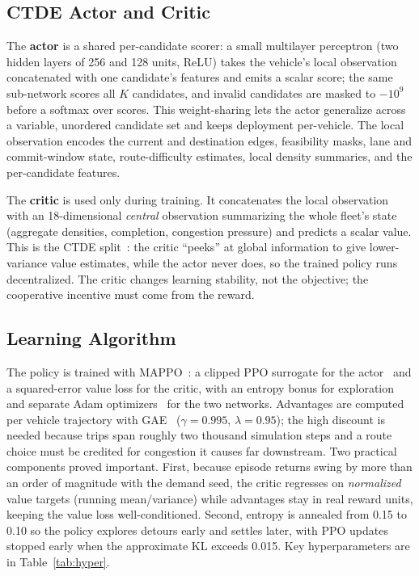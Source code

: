 \subsection{CTDE Actor and Critic}
The \textbf{actor} is a shared per-candidate
scorer: a small multilayer perceptron (two hidden layers of 256 and 128 units, ReLU)
takes the vehicle's local observation concatenated with one candidate's features and
emits a scalar score; the same sub-network scores all $K$ candidates, and invalid
candidates are masked to $-10^{9}$ before a softmax over scores. This weight-sharing lets
the actor generalize across a variable, unordered candidate set and keeps deployment
per-vehicle. The local observation encodes the current and destination edges, feasibility
masks, lane and commit-window state, route-difficulty estimates, local density summaries,
and the per-candidate features.

The \textbf{critic} is used only during training. It concatenates the local observation
with an 18-dimensional \emph{central} observation summarizing the whole fleet's state
(aggregate densities, completion, congestion pressure) and predicts a scalar value. This
is the CTDE split~\citep{lowe2017maddpg}: the critic ``peeks'' at global information to
give lower-variance value estimates, while the actor never does, so the trained policy
runs decentralized. The critic changes learning stability, not the objective; the
cooperative incentive must come from the reward.

\subsection{Learning Algorithm}
The policy is trained with MAPPO~\citep{yu2022mappo}: a clipped PPO surrogate for the
actor~\citep{schulman2017ppo} and a squared-error value loss for the critic, with an
entropy bonus for exploration and separate Adam optimizers~\citep{kingma2015adam} for the
two networks. Advantages are computed per vehicle trajectory with
GAE~\citep{schulman2016gae} ($\gamma{=}0.995$, $\lambda{=}0.95$); the high discount is
needed because trips span roughly two thousand simulation steps and a route choice must
be credited for congestion it causes far downstream. Two practical components proved
important. First, because episode returns swing by more than an order of magnitude with the
demand seed, the critic regresses on \emph{normalized} value targets (running mean/variance)
while advantages stay in real reward units, keeping the value loss well-conditioned. Second,
entropy is annealed from 0.15 to 0.10 so the policy explores detours early and settles later,
with PPO updates stopped early when the approximate KL exceeds 0.015. Key hyperparameters
are in Table~\ref{tab:hyper}.

